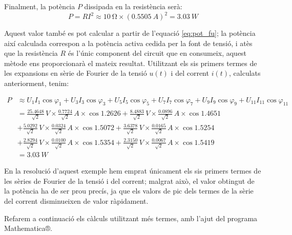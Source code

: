 \begin{exemple}
    Finalment, la potència $P$ dissipada en la resistència serà:
    \[
        P = R I^2 \approx \qty{10}{\ohm} \times (\qty{0,5505}{A})^2 =
        \qty{3,03}{W}
    \]

    Aquest valor també es pot calcular a partir de l'equació
    \eqref{eq:pot_fu}; la potència així calculada correspon a la
    potència activa cedida per la font de tensió, i atès que la
    resistència $R$ és l'únic component del circuit que en consumeix,
    aquest mètode ens proporcionarà el mateix resultat. Utilitzant els sis primers termes  de les
    expansions en sèrie de Fourier de la tensió $u(t)$ i del corrent
    $i(t)$, calculats anteriorment, tenim:

    \[\begin{split}
        P &\approx U_1 I_1 \cos\varphi_1 +  U_3 I_3 \cos\varphi_3 +
         U_5 I_5 \cos\varphi_5 + U_7 I_7 \cos\varphi_7 +
         U_9 I_9 \cos\varphi_9 + U_{11} I_{11} \cos\varphi_{11} \\[0.7ex]
        &= \frac{\num{25,4648}}{\sqrt{2}}\unit{\,V} \times
        \frac{\num{0,7724}}{\sqrt{2}}\unit{\,A} \times \cos \num{1,2626} +
        \frac{\num{8,4883}}{\sqrt{2}}\unit{\,V} \times
        \frac{\num{0,0896}}{\sqrt{2}}\unit{\,A} \times \cos \num{1,4651}  \\[0.7ex]
        &+ \frac{\num{5,0292}}{\sqrt{2}}\unit{\,V} \times
        \frac{\num{0,0324}}{\sqrt{2}}\unit{\,A} \times \cos \num{1,5072} +
        \frac{\num{3,6378}}{\sqrt{2}}\unit{\,V} \times
        \frac{\num{0,0165}}{\sqrt{2}}\unit{\,A} \times \cos \num{1,5254} \\[0.7ex]
        &+ \frac{\num{2,8294}}{\sqrt{2}}\unit{\,V} \times
        \frac{\num{0,0100}}{\sqrt{2}}\unit{\,A} \times \cos \num{1,5354} +
        \frac{\num{2,3150}}{\sqrt{2}}\unit{\,V} \times
        \frac{\num{0,0067}}{\sqrt{2}}\unit{\,A} \times \cos \num{1,5419}\\[0.7ex]
        &= \qty{3,03}{W}
    \end{split}\]

    En la resolució d'aquest exemple hem emprat únicament els sis
    primers termes de les sèries de Fourier de la tensió i del corrent;
    malgrat això, el valor  obtingut de la potència ha de ser prou precís, ja que
    els valors de pic dels termes de la sèrie del corrent disminueixen de
    valor ràpidament.

    Refarem a continuació els càlculs utilitzant més termes, amb l'ajut
    del programa
    Mathematica®.   


\end{exemple}

